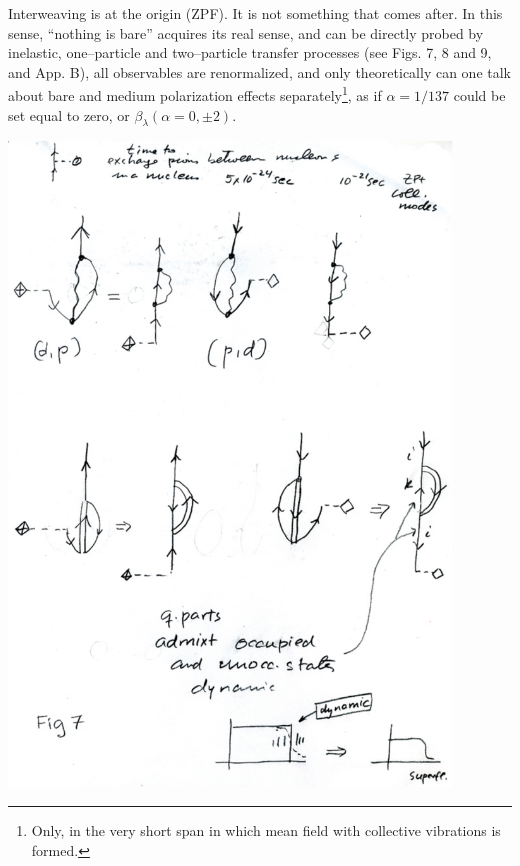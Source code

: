 \documentclass[a4paper,onecolumn,superscriptaddress,12pt,nofootinbib,twoside,raggedfooter,notitlepage]{revtex4-1}
\begin{document}
Interweaving is at the origin (ZPF). It is not something that comes after. In this sense, ``nothing is bare'' acquires its real sense, and can be directly probed by inelastic, one--particle and two--particle transfer processes (see Figs. 7, 8 and 9, and App. B), all observables are renormalized, and only theoretically can one talk about bare and medium polarization effects separately\footnote{Only, in the very short span in which mean field with collective vibrations is formed.}, as if $\alpha = 1/137$ could be set equal to zero, or $\beta_\lambda (\alpha=0,\pm 2)$.
\begin{center}
	\includegraphics[width=0.88\textwidth]{figs/fig_i5}
\end{center}
\end{document}
